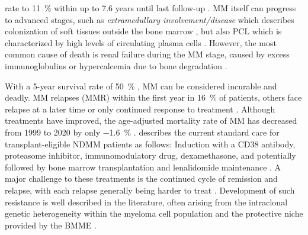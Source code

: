 rate to \SI{11}{\percent} within up to 7.6 years until last
follow-up
\cite{abdallahModeProgressionSmoldering2024,
    mateosmaria-victoriaLenalidomideDexamethasoneHighRisk2013}. \ac{MM} itself can
progress to advanced stages, such as \emph{extramedullary involvement/disease}
which describes colonization of soft tissues outside the bone marrow
\cite{bladeExtramedullaryDiseaseMultiple2022}, but also \ac{PCL} which is
characterized by high levels of circulating plasma cells
\cite{jungUpdatePrimaryPlasma2022}. However, the most common cause of death is
renal failure during the \ac{MM} stage, caused by excess immunoglobulins or
hypercalcemia due to bone degradation \cite{kunduMultipleMyelomaRenal2022}.

With a 5-year survival rate of \SI{50}{\percent}
\cite{turessonRapidlyChangingMyeloma2018}, \ac{MM} can be considered incurable
and deadly. \ac{MM} relapses (\acs{MMR}) within the first year in \SI{16}{\percent} of
patients, others face relapse at a later time or only continued
response to treatment \cite{majithiaEarlyRelapseFollowing2016}. Although
treatments have improved, the age-adjusted mortality rate of \ac{MM} has
decreased from 1999 to 2020 by only \SI{-1.6}{\percent}
\cite{doddiDisparitiesMultipleMyeloma2024}.
\citet{engelhardtFunctionalCureLongterm2024} describes the current standard care
for transplant-eligible \ac{NDMM} patients as follows: Induction
with a CD38 antibody, proteasome inhibitor, immunomodulatory drug,
dexamethasone, and potentially followed by bone marrow transplantation and
lenalidomide maintenance \cite{rajkumarMultipleMyelomaCurrent2020}. A major
challenge to these treatments is the continued cycle of remission and relapse,
with each relapse generally being harder to treat
\cite{podarRelapsedRefractoryMultiple2021}. Development of such resistance is
well described in the literature, often arising from the intraclonal genetic
heterogeneity within the myeloma cell population and the protective niche
provided by the \ac{BMME}
\cite{solimandoDrugResistanceMultiple2022}.



